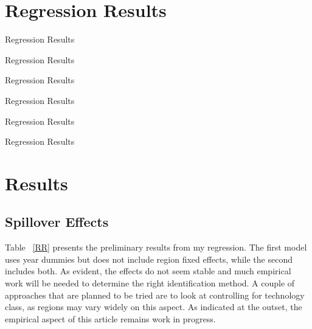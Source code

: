\documentclass[12pt]{article}
\begin{document}
\section{Regression Results}


\begin{table}
\caption{Regression Results}

\label{CC}
\end{table}

\begin{table}
\caption{Regression Results}

\label{CR}
\end{table}

\begin{table}
\caption{Regression Results}

\label{CT}
\end{table}

\begin{table}
\caption{Regression Results}

\label{RC}
\end{table}

\begin{table}
\caption{Regression Results}

\label{RR}
\end{table}

\begin{table}
\caption{Regression Results}

\label{RT}
\end{table}


\section{Results}
\subsection{Spillover Effects}
Table ~\ref{RR} presents the preliminary results from my regression. The first model uses year dummies but does not include region fixed effects, while the second includes both. As evident, the effects do not seem stable and much empirical work will be needed to determine the right identification method. A couple of approaches that are planned to be tried are to look at controlling for technology class, as regions may vary widely on this aspect. As indicated at the outset, the empirical aspect of this article remains work in progress.
\end{document}
